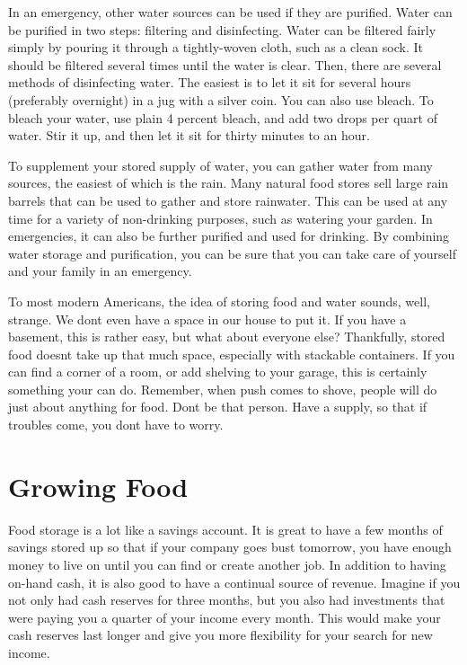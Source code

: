 In an emergency, other water sources can be used if they are purified.
Water can be purified in two steps: filtering and disinfecting. Water
can be filtered fairly simply by pouring it through a tightly-woven
cloth, such as a clean sock. It should be filtered several times until
the water is clear. Then, there are several methods of disinfecting
water. The easiest is to let it sit for several hours (preferably
overnight) in a jug with a silver coin. You can also use bleach. To
bleach your water, use plain 4 percent bleach, and add two drops per
quart of water. Stir it up, and then let it sit for thirty minutes to
an hour. 

To supplement your stored supply of water, you can gather water from
many sources, the easiest of which is the rain. Many natural food
stores sell large rain barrels that can be used to gather and store
rainwater. This can be used at any time for a variety of non-drinking
purposes, such as watering your garden.  In emergencies, it can also be
further purified and used for drinking. By combining water storage and
purification, you can be sure that you can take care of yourself and
your family in an emergency. 

To most modern Americans, the idea of storing food and water sounds,
well, strange.  We don{\textquotesingle}t even have a space in our
house to put it.  If you have a basement, this is rather easy, but what
about everyone else?  Thankfully, stored food doesn{\textquotesingle}t
take up that much space, especially with stackable containers.  If you
can find a corner of a room, or add shelving to your garage, this is
certainly something your can do.  Remember, when push comes to shove,
people will do just about anything for food.  Don{\textquotesingle}t be
that person.  Have a supply, so that if troubles come, you
don{\textquotesingle}t have to worry.

\section{Growing Food}

Food storage is a lot like a savings account. It is great to have a few
months of savings stored up so that if your company goes bust tomorrow,
you have enough money to live on until you can find or create another
job. In addition to having on-hand cash, it is also good to have a
continual source of revenue. Imagine if you not only had cash reserves
for three months, but you also had investments that were paying you a
quarter of your income every month. This would make your cash reserves
last longer and give you more flexibility for your search for new
income.

